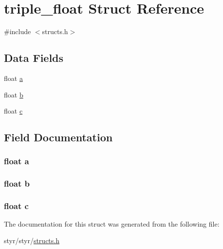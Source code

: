 \hypertarget{structtriple__float}{}\section{triple\+\_\+float Struct Reference}
\label{structtriple__float}


{\ttfamily \#include $<$structs.\+h$>$}

\subsection*{Data Fields}
\begin{DoxyCompactItemize}
\item 
float \hyperlink{structtriple__float_a4aec1a5be9d9a4a394a2e49e9744286e}{a}
\item 
float \hyperlink{structtriple__float_a83fc1af92e29717b4513d121b0c72c7d}{b}
\item 
float \hyperlink{structtriple__float_ae78103ab33f03590e84ff7bc735629d7}{c}
\end{DoxyCompactItemize}


\subsection{Field Documentation}
\subsubsection[{\texorpdfstring{a}{a}}]{\setlength{\rightskip}{0pt plus 5cm}float a}\hypertarget{structtriple__float_a4aec1a5be9d9a4a394a2e49e9744286e}{}\label{structtriple__float_a4aec1a5be9d9a4a394a2e49e9744286e}
\subsubsection[{\texorpdfstring{b}{b}}]{\setlength{\rightskip}{0pt plus 5cm}float b}\hypertarget{structtriple__float_a83fc1af92e29717b4513d121b0c72c7d}{}\label{structtriple__float_a83fc1af92e29717b4513d121b0c72c7d}
\subsubsection[{\texorpdfstring{c}{c}}]{\setlength{\rightskip}{0pt plus 5cm}float c}\hypertarget{structtriple__float_ae78103ab33f03590e84ff7bc735629d7}{}\label{structtriple__float_ae78103ab33f03590e84ff7bc735629d7}


The documentation for this struct was generated from the following file\+:\begin{DoxyCompactItemize}
\item 
styr/styr/\hyperlink{structs_8h}{structs.\+h}\end{DoxyCompactItemize}
